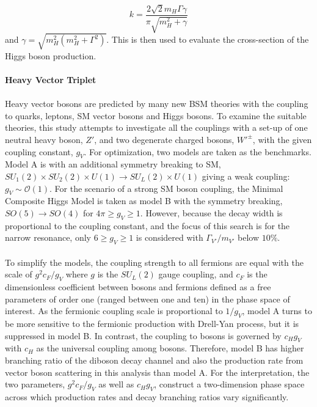 \begin{equation}
k=\frac{2\sqrt{2}m_{H}\Gamma\gamma}{\pi\sqrt{m_{H}^2+\gamma}}
\end{equation}
and $\gamma=\sqrt{m_{H}^2(m_{H}^2+\Gamma^2)}$. This is then used to evaluate the cross-section of the Higgs boson production.
\\
\\{\bf Heavy Vector Triplet}
\\
\\Heavy vector bosons are predicted by many new BSM theories with the coupling to quarks, leptons, SM vector bosons and Higgs bosons. To examine the suitable theories, this study attempts to investigate all the couplings with a set-up of one neutral heavy boson, $Z'$, and two degenerate charged bosons, $W'^{\pm}$, with the given coupling constant, $g_{V}$. For optimization,  two models are taken as the benchmarks\cite{Pappadopulo:2014qza,deBlas:2012qp}. Model A is with an additional symmetry breaking to SM, $SU_{1}(2)\times SU_{2}(2) \times U(1) \rightarrow SU_{L}(2) \times U(1)$ giving a weak coupling: $g_{V} \sim \mathcal{O}(1)$. For the scenario of a strong SM boson coupling, the Minimal Composite Higgs Model is taken as model B with the symmetry breaking, $SO(5) \rightarrow SO(4)$ for $4\pi \geq g_{V} \geq 1$. However, because the decay width is proportional to the coupling constant, and the focus of this search is for the narrow resonance, only $6 \geq g_{V} \geq 1$ is considered with $\Gamma_{V'}/m_{V'}$ below $10\%$.
\\
\\To simplify the models, the coupling strength to all fermions are equal with the scale of $g^2c_{F}/g_{V}$ where $g$ is the $SU_{L}(2)$ gauge coupling, and $c_{F}$ is the dimensionless coefficient between bosons and fermions defined as a free parameters of order one (ranged between one and ten) in the phase space of interest. As the fermionic coupling scale is proportional to $1/g_{V}$, model A turns to be more sensitive to the fermionic production with Drell-Yan process, but it is suppressed in model B. In contrast, the coupling to bosons is governed by $c_{H}g_{V}$ with $c_{H}$ as the universal coupling among bosons. Therefore, model B has higher branching ratio of the diboson decay channel and also the production rate from vector boson scattering in this analysis than model A. For the interpretation, the two parameters, $g^2c_{F}/g_{V}$ as well as $c_{H}g_{V}$, construct a two-dimension phase space across which production rates and decay branching ratios vary significantly. 
